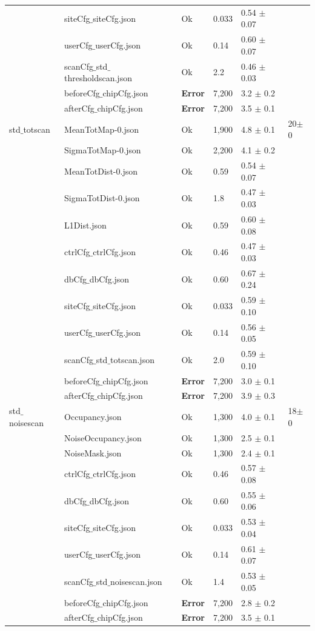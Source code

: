 {\begin{longtable}{|llllll|}
 & siteCfg$\_$siteCfg.json & Ok & 0.033 & 0.54 $\pm$ 0.07 & \\
 & userCfg$\_$userCfg.json & Ok & 0.14 & 0.60 $\pm$ 0.07 & \\
 & scanCfg$\_$std$\_$thresholdscan.json & Ok & 2.2 & 0.46 $\pm$ 0.03 & \\
 & beforeCfg$\_$chipCfg.json & { \bf Error} & 7,200 & 3.2 $\pm$ 0.2 & \\
 & afterCfg$\_$chipCfg.json & { \bf Error} & 7,200 & 3.5 $\pm$ 0.1 & \\
\hline
std$\_$totscan & MeanTotMap-0.json & Ok & 1,900 & 4.8 $\pm$ 0.1 & 20$\pm$0\\
 & SigmaTotMap-0.json & Ok & 2,200 & 4.1 $\pm$ 0.2 & \\
 & MeanTotDist-0.json & Ok & 0.59 & 0.54 $\pm$ 0.07 & \\
 & SigmaTotDist-0.json & Ok & 1.8 & 0.47 $\pm$ 0.03 & \\
 & L1Dist.json & Ok & 0.59 & 0.60 $\pm$ 0.08 & \\
 & ctrlCfg$\_$ctrlCfg.json & Ok & 0.46 & 0.47 $\pm$ 0.03 & \\
 & dbCfg$\_$dbCfg.json & Ok & 0.60 & 0.67 $\pm$ 0.24 & \\
 & siteCfg$\_$siteCfg.json & Ok & 0.033 & 0.59 $\pm$ 0.10 & \\
 & userCfg$\_$userCfg.json & Ok & 0.14 & 0.56 $\pm$ 0.05 & \\
 & scanCfg$\_$std$\_$totscan.json & Ok & 2.0 & 0.59 $\pm$ 0.10 & \\
 & beforeCfg$\_$chipCfg.json & { \bf Error} & 7,200 & 3.0 $\pm$ 0.1 & \\
 & afterCfg$\_$chipCfg.json & { \bf Error} & 7,200 & 3.9 $\pm$ 0.3 & \\
\hline
std$\_$noisescan & Occupancy.json & Ok & 1,300 & 4.0 $\pm$ 0.1 & 18$\pm$0\\
 & NoiseOccupancy.json & Ok & 1,300 & 2.5 $\pm$ 0.1 & \\
 & NoiseMask.json & Ok & 1,300 & 2.4 $\pm$ 0.1 & \\
 & ctrlCfg$\_$ctrlCfg.json & Ok & 0.46 & 0.57 $\pm$ 0.08 & \\
 & dbCfg$\_$dbCfg.json & Ok & 0.60 & 0.55 $\pm$ 0.06 & \\
 & siteCfg$\_$siteCfg.json & Ok & 0.033 & 0.53 $\pm$ 0.04 & \\
 & userCfg$\_$userCfg.json & Ok & 0.14 & 0.61 $\pm$ 0.07 & \\
 & scanCfg$\_$std$\_$noisescan.json & Ok & 1.4 & 0.53 $\pm$ 0.05 & \\
 & beforeCfg$\_$chipCfg.json & { \bf Error} & 7,200 & 2.8 $\pm$ 0.2 & \\
 & afterCfg$\_$chipCfg.json & { \bf Error} & 7,200 & 3.5 $\pm$ 0.1 & \\
\hline
\end{longtable}
}

